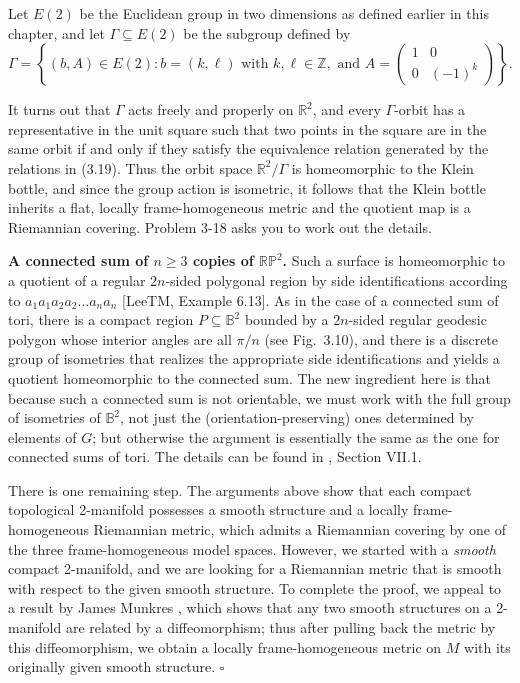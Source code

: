 Let $E(2)$ be the Euclidean group in two dimensions as defined earlier in this chapter, and let $\Gamma \subseteq E(2)$ be the subgroup defined by
\begin{equation}
\Gamma = \left\{(b, A) \in E(2) : b = (k, \ell) \text{ with } k, \ell \in \mathbb{Z}, \text{ and } A = \begin{pmatrix} 1 & 0 \\ 0 & (-1)^k \end{pmatrix}\right\}.
\tag{3.20}
\end{equation}

It turns out that $\Gamma$ acts freely and properly on $\mathbb{R}^2$, and every $\Gamma$-orbit has a representative in the unit square such that two points in the square are in the same orbit if and only if they satisfy the equivalence relation generated by the relations in (3.19). Thus the orbit space $\mathbb{R}^2/\Gamma$ is homeomorphic to the Klein bottle, and since the group action is isometric, it follows that the Klein bottle inherits a flat, locally frame-homogeneous metric and the quotient map is a Riemannian covering. Problem 3-18 asks you to work out the details.

\noindent\textbf{A connected sum of $n \ge 3$ copies of $\mathbb{RP}^2$.} Such a surface is homeomorphic to a quotient of a regular $2n$-sided polygonal region by side identifications according to $a_1 a_1 a_2 a_2 \ldots a_n a_n$ [LeeTM, Example 6.13]. As in the case of a connected sum of tori, there is a compact region $P \subseteq \mathbb{B}^2$ bounded by a $2n$-sided regular geodesic polygon whose interior angles are all $\pi/n$ (see Fig.~3.10), and there is a discrete group of isometries that realizes the appropriate side identifications and yields a quotient homeomorphic to the connected sum. The new ingredient here is that because such a connected sum is not orientable, we must work with the full group of isometries of $\mathbb{B}^2$, not just the (orientation-preserving) ones determined by elements of $G$; but
otherwise the argument is essentially the same as the one for connected sums of tori.
The details can be found in \cite{Ive92}, Section VII.1.

There is one remaining step. The arguments above show that each compact topological 2-manifold possesses a smooth structure and a locally frame-homogeneous Riemannian metric, which admits a Riemannian covering by one of the three frame-homogeneous model spaces. However, we started with a \emph{smooth} compact 2-manifold, and we are looking for a Riemannian metric that is smooth with respect to the given smooth structure. To complete the proof, we appeal to a result by James Munkres \cite{Mun56}, which shows that any two smooth structures on a 2-manifold are related by a diffeomorphism; thus after pulling back the metric by this diffeomorphism, we obtain a locally frame-homogeneous metric on $M$ with its originally given smooth structure. $\square$

